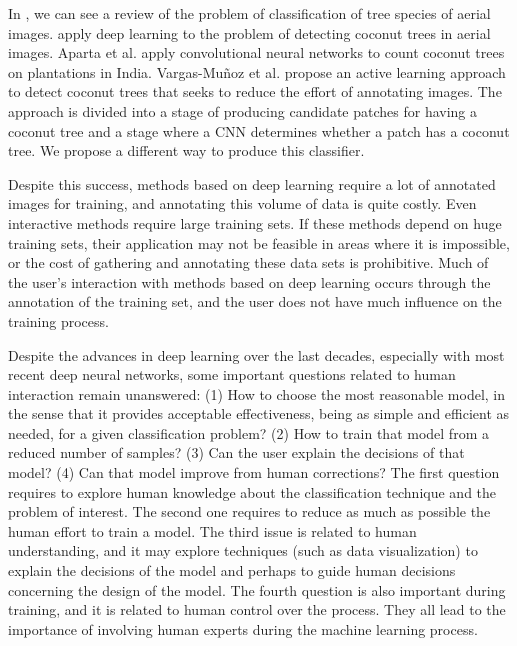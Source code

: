 \documentclass[a4paper,conference]{IEEEtran}
\begin{document}
In \cite{fassnacht2016review}, we can see a review of the problem of classification of tree species of aerial images. \cite{puttemans2018comparing} apply deep learning to the problem of detecting coconut trees in aerial images. Aparta et al. \cite{aparna2018cnn} apply convolutional neural networks to count coconut trees on plantations in India. Vargas-Muñoz et al. \cite{8899005} propose an active learning approach to detect coconut trees that seeks to reduce the effort of annotating images. The \cite{8899005} approach is divided into a stage of producing candidate patches for having a coconut tree and a stage where a CNN determines whether a patch has a coconut tree. We propose a different way to produce this classifier.  

Despite this success, methods based on deep learning require a lot of annotated images for training, and annotating this volume of data is quite costly. Even interactive methods require large training sets. If these methods depend on huge training sets, their application may not be feasible in areas where it is impossible, or the cost of gathering and annotating these data sets is prohibitive. Much of the user's interaction with methods based on deep learning occurs through the annotation of the training set, and the user does not have much influence on the training process.

Despite the advances in deep learning over the last decades, especially with most recent deep neural networks, some important questions related to human interaction remain unanswered: (1) How to choose the most reasonable model, in the sense that it provides acceptable effectiveness, being as simple and efficient as needed, for a given classification problem? (2) How to train that model from a reduced number of samples?  (3) Can the user explain the decisions of that model? (4) Can that model improve from human corrections? The first question requires to explore human knowledge about the classification technique and the problem of interest. The second one requires to reduce as much as possible the human effort to train a model. The third issue is related to human understanding, and it may explore techniques (such as data visualization) to explain the decisions of the model and perhaps to guide human decisions concerning the design of the model. The fourth question is also important during training, and it is related to human control over the process. They all lead to the importance of involving human experts during the machine learning process.
\end{document}
